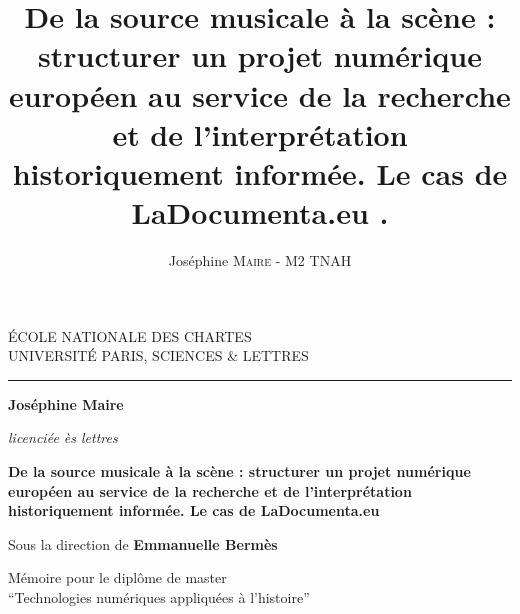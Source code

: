 \documentclass[12pt,twoside]{book}
\author{Joséphine \textsc{Maire} - M2 TNAH}
\title{De la source musicale à la scène : structurer un projet numérique européen au service de la recherche et de l'interprétation historiquement informée. Le cas de LaDocumenta.eu .}
\begin{document}
	\begin{titlepage}
		\begin{center}
			
			\bigskip
			
			\begin{large}				
				ÉCOLE NATIONALE DES CHARTES\\
				UNIVERSITÉ PARIS, SCIENCES \& LETTRES
			\end{large}
			\begin{center}\rule{2cm}{0.02cm}\end{center}
			
			\bigskip
			\bigskip
			\bigskip
			\begin{Large}
				\textbf{Joséphine Maire}\\
			\end{Large}
			\begin{normalsize} \textit{licenciée ès lettres}\\
			\end{normalsize}
			
			\bigskip
			\bigskip
			\bigskip
			
			\begin{Huge}
				\textbf{De la source musicale à la scène : structurer un projet numérique européen au service de la recherche et de l'interprétation historiquement informée. Le cas de LaDocumenta.eu}\\
			\end{Huge}
			\bigskip
			\bigskip
			\begin{LARGE}
				
			\end{LARGE}
			
			\bigskip
			\bigskip
			\bigskip
			\begin{large}
				Sous la direction de \textbf{Emmanuelle Bermès}
			\end{large}
			\vfill
			
			\begin{large}
				Mémoire 
				pour le diplôme de master \\
				\enquote{Technologies numériques appliquées à l'histoire} \\
			\end{large}
			
		\end{center}
	\end{titlepage}
	
	\thispagestyle{empty}\cleardoublepage
	
	\frontmatter
	
\end{document}
